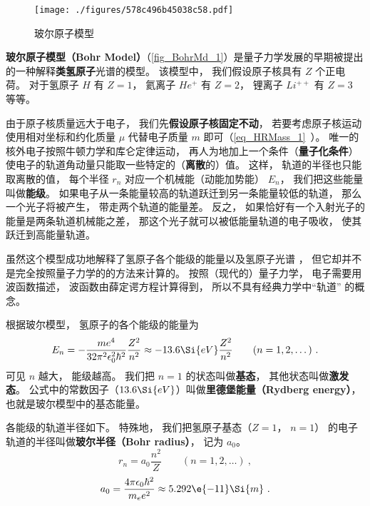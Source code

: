 

\begin{figure}[ht]
\centering
\texttt{[image: ./figures/578c496b45038c58.pdf]}
\caption{玻尔原子模型} \label{fig_BohrMd_1}
\end{figure}

\textbf{玻尔原子模型（Bohr Model）}（\autoref{fig_BohrMd_1}）是量子力学发展的早期被提出的一种解释\textbf{类氢原子}光谱的模型。 该模型中， 我们假设原子核具有 $Z$ 个正电荷。 对于氢原子 $H$ 有 $Z = 1$， 氦离子 $He^+$ 有 $Z = 2$， 锂离子 $Li^{++}$ 有 $Z = 3$ 等等。

由于原子核质量远大于电子， 我们先\textbf{假设原子核固定不动}， 若要考虑原子核运动使用相对坐标和约化质量 $\mu$ 代替电子质量 $m$ 即可（\autoref{eq_HRMass_1}~）。
唯一的核外电子按照牛顿力学和库仑定律运动， 再人为地加上一个条件（\textbf{量子化条件}）使电子的轨道角动量只能取一些特定的（\textbf{离散}的）值。 这样， 轨道的半径也只能取离散的值， 每个半径 $r_n$ 对应一个机械能（动能加势能） $E_n$， 我们把这些能量叫做\textbf{能级}。 如果电子从一条能量较高的轨道跃迁到另一条能量较低的轨道， 那么一个光子将被产生， 带走两个轨道的能量差。 反之， 如果恰好有一个入射光子的能量是两条轨道机械能之差， 那这个光子就可以被低能量轨道的电子吸收， 使其跃迁到高能量轨道。

虽然这个模型成功地解释了氢原子各个能级的能量以及氢原子光谱%
， 但它却并不是完全按照量子力学的的方法来计算的。 按照（现代的）量子力学， 电子需要用波函数描述， 波函数由薛定谔方程计算得到， 所以不具有经典力学中“轨道” 的概念。

根据玻尔模型， 氢原子的各个能级的能量为
\begin{equation}
E_n =  - \frac{m e^4}{32 \pi^2 \epsilon_0^2 \hbar ^2} \frac{Z^2}{n^2} \approx - 13.6\Si{eV} \frac{Z^2}{n^2}
\qquad (n = 1, 2, \dots)~.
\end{equation}
可见 $n$ 越大， 能级越高。 我们把 $n = 1$ 的状态叫做\textbf{基态}， 其他状态叫做\textbf{激发态}。 公式中的常数因子（$13.6\Si{eV}$）叫做\textbf{里德堡能量（Rydberg energy）}， 也就是玻尔模型中的基态能量。

各能级的轨道半径如下。 特殊地， 我们把氢原子基态（$Z = 1$， $n = 1$） 的电子轨道的半径叫做\textbf{玻尔半径（Bohr radius）}， 记为 $a_0$。
\begin{equation}\label{eq_BohrMd_1}
r_n = a_0 \frac{n^2}{Z}
\qquad (n = 1, 2, \dots)~,
\end{equation}
\begin{equation}\label{eq_BohrMd_3}
a_0 = \frac{4\pi \epsilon_0 \hbar^2}{m_e e^2} \approx 5.292\e{-11}\Si{m}~.
\end{equation}


